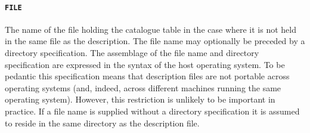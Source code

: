\documentclass[twoside,11pt]{article}
\renewcommand{\_}{\texttt{\symbol{95}}}
\begin{document}
%
%
%
%
%

\paragraph{{\tt FILE}} The name of the file holding the catalogue table
in the case where it is not held in the same file as the description.
The file name may optionally be preceded by a directory specification.
The assemblage of the file name and directory specification are
expressed in the syntax of the host operating system.  To be pedantic
this specification means that description files are not portable
across operating systems (and, indeed, across different machines
running the same operating system).  However, this restriction is
unlikely to be important in practice.  If a file name is supplied
without a directory specification it is assumed to reside in the same
directory as the description file.
\end{document}
